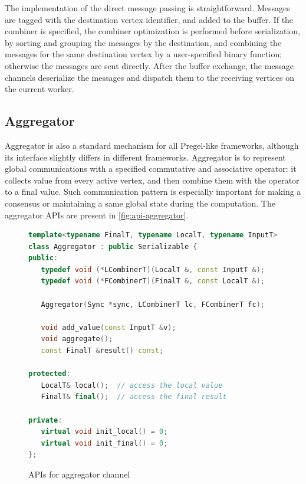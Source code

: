 \documentclass{sokendai_thesis} %
\begin{document}
The implementation of the direct message passing is straightforward.
Messages are tagged with the destination vertex identifier, and added to the buffer.
If the combiner is specified, the combiner optimization is performed before serialization, by sorting and grouping the messages by the destination, and combining the messages for the same destination vertex by a user-specified binary function; otherwise the messages are sent directly.
After the buffer exchange, the message channels deserialize the messages and dispatch them to the receiving vertices on the current worker.

\subsection{Aggregator}

Aggregator is also a standard mechanism for all Pregel-like frameworks, although its interface slightly differs in different frameworks.
Aggregator is to represent global communications with a specified commutative and associative operator: it collects value from every active vertex, and then combine them with the operator to a final value.
Such communication pattern is especially important for making a consensus or maintaining a same global state during the computation.
The aggregator APIs are present in \autoref{fig:api-aggregator}.

\begin{figure}[ht]
\centering
\vspace{-2ex}
\begin{lstlisting}[basicstyle=\small\ttfamily,numbers=none,language=c++]
template<typename FinalT, typename LocalT, typename InputT>
class Aggregator : public Serializable {
public:
   typedef void (*LCombinerT)(LocalT &, const InputT &);
   typedef void (*FCombinerT)(FinalT &, const LocalT &);

   Aggregator(Sync *sync, LCombinerT lc, FCombinerT fc);

   void add_value(const InputT &v);
   void aggregate();
   const FinalT &result() const;

protected:
   LocalT& local();  // access the local value
   FinalT& final();  // access the final result

private:
   virtual void init_local() = 0;
   virtual void init_final() = 0;
};
\end{lstlisting}
\vspace{-2ex}
\caption{APIs for aggregator channel}
\label{fig:api-aggregator}
\end{figure}
\end{document}
